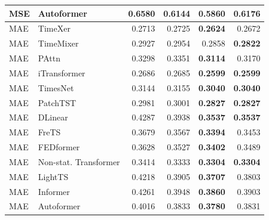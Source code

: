 \begin{longtable}{llrrrr}
MSE & Autoformer & 0.6580 & 0.6144 & \textbf{0.5860} & 0.6176 \\
\midrule
MAE & TimeXer & 0.2713 & 0.2725 & \textbf{0.2624} & 0.2672 \\
MAE & TimeMixer & 0.2927 & 0.2954 & 0.2858 & \textbf{0.2822} \\
MAE & PAttn & 0.3298 & 0.3351 & \textbf{0.3114} & 0.3170 \\
MAE & iTransformer & 0.2686 & 0.2685 & \textbf{0.2599} & \textbf{0.2599} \\
MAE & TimesNet & 0.3144 & 0.3155 & \textbf{0.3040} & \textbf{0.3040} \\
MAE & PatchTST & 0.2981 & 0.3001 & \textbf{0.2827} & \textbf{0.2827} \\
MAE & DLinear & 0.4287 & 0.3938 & \textbf{0.3537} & \textbf{0.3537} \\
MAE & FreTS & 0.3679 & 0.3567 & \textbf{0.3394} & 0.3453 \\
MAE & FEDformer & 0.3628 & 0.3527 & \textbf{0.3402} & 0.3489 \\
MAE & Non-stat. Transformer & 0.3414 & 0.3333 & \textbf{0.3304} & \textbf{0.3304} \\
MAE & LightTS & 0.4218 & 0.3905 & \textbf{0.3707} & 0.3803 \\
MAE & Informer & 0.4261 & 0.3948 & \textbf{0.3860} & 0.3903 \\
MAE & Autoformer & 0.4016 & 0.3833 & \textbf{0.3780} & 0.3831 \\
\end{longtable}
\endgroup

